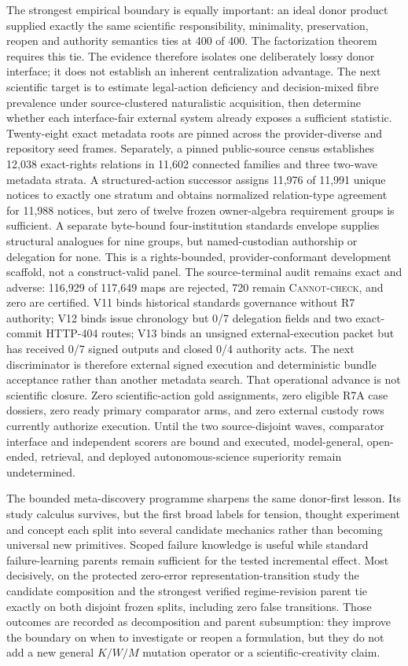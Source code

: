 The strongest empirical boundary is equally important: an ideal donor product
supplied exactly the same scientific responsibility, minimality, preservation,
reopen and authority semantics ties at 400 of 400. The factorization theorem
requires this tie. The evidence therefore isolates one deliberately lossy donor
interface; it does not establish an inherent centralization advantage. The next
scientific target is to estimate legal-action deficiency and decision-mixed
fibre prevalence under source-clustered naturalistic acquisition, then
determine whether each interface-fair external system already exposes a
sufficient statistic. Twenty-eight exact metadata roots are pinned across the
provider-diverse and repository seed frames. Separately, a pinned public-source
census establishes 12,038 exact-rights relations in 11,602 connected families
and three two-wave metadata strata. A structured-action successor assigns
11,976 of 11,991 unique notices to exactly one stratum and obtains normalized
relation-type agreement for 11,988 notices, but zero of twelve frozen
owner-algebra requirement groups is sufficient. A separate byte-bound
four-institution standards envelope supplies structural analogues for nine
groups, but named-custodian authorship or delegation for none. This is a
rights-bounded, provider-conformant development scaffold, not a construct-valid
panel. The source-terminal audit remains exact and adverse: 116,929 of 117,649
maps are rejected, 720 remain \textsc{Cannot-check}, and zero are certified.
V11 binds historical standards governance without R7 authority; V12 binds issue
chronology but 0/7 delegation fields and two exact-commit HTTP-404 routes; V13
binds an unsigned external-execution packet but has received 0/7 signed outputs
and closed 0/4 authority acts. The next discriminator is therefore external
signed execution and deterministic bundle acceptance rather than another
metadata search. That operational advance is not scientific closure. Zero
scientific-action gold assignments, zero eligible R7A case dossiers, zero
ready primary comparator arms, and zero external custody rows currently
authorize execution. Until the
two source-disjoint waves, comparator interface and independent scorers are
bound and executed, model-general, open-ended, retrieval, and deployed
autonomous-science superiority remain undetermined.

The bounded meta-discovery programme sharpens the same donor-first lesson. Its
study calculus survives, but the first broad labels for tension, thought
experiment and concept each split into several candidate mechanics rather than
becoming universal new primitives. Scoped failure knowledge is useful while
standard failure-learning parents remain sufficient for the tested incremental
effect. Most decisively, on the protected zero-error representation-transition
study the candidate composition and the strongest verified regime-revision
parent tie exactly on both disjoint frozen splits, including zero false
transitions. Those outcomes are recorded as decomposition and parent
subsumption: they improve the boundary on when to investigate or reopen a
formulation, but they do not add a new general $K/W/M$ mutation operator or a
scientific-creativity claim.
